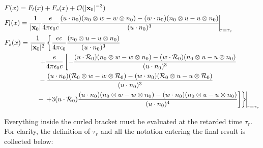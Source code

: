 \begin{highlightbox}
\begin{align}
     & F(x)=F_l(x)+F_s(x)+{\cal O}(|{\bf x}_0|^{-3})                                                                                                                                                                   \\
     & F_l(x)={\frac1{|{\bf x}_0|}\frac{e}{4\pi\epsilon_0c}\frac{(u\cdot n_0)(n_0\otimes w-w\otimes n_0)-(w\cdot n_0)(n_0\otimes u- u \otimes n_0)}{(u\cdot n_0)^3}\vline}_{\tau=\tau_r}                       \\
     & F_s(x)=\frac1{|{\bf x}_0|^2}\left\{\frac{ec}{4\pi\epsilon_0}\frac{(n_0\otimes u- u \otimes n_0)}{(u\cdot n_0)^3}\right.\nonumber                                                                                \\
     & \left.\qquad \qquad \quad+\frac{e}{4\pi\epsilon_0c}\left[-\frac{(u\cdot {\cal R}_0)(n_0\otimes w-w\otimes n_0)-(w\cdot {\cal R}_0)(n_0\otimes u- u \otimes n_0)}{(u\cdot n_0)^3}\right.\right.\nonumber \\
     & \qquad \qquad\quad-\frac{(u\cdot n_0)({\cal R}_0\otimes w-w\otimes {\cal R}_0)-(w\cdot n_0)({\cal R}_0\otimes u- u \otimes {\cal R}_0)}{(u\cdot n_0)^3}\nonumber                                        \\
     & {\qquad \qquad\quad-\left.\left.+3(u\cdot {\cal R}_0)\frac{(u\cdot n_0)(n_0\otimes w-w\otimes n_0)-(w\cdot n_0)(n_0\otimes u- u \otimes n_0)}{(u\cdot n_0)^4}\right]\right\}\vline}_{\tau=\tau_r}
\end{align}
\end{highlightbox}
Everything inside the curled bracket  must be evaluated at the retarded time $\tau_r$. For clarity, the definition of $\tau_r$ and  all the notation entering the final result is collected below:
